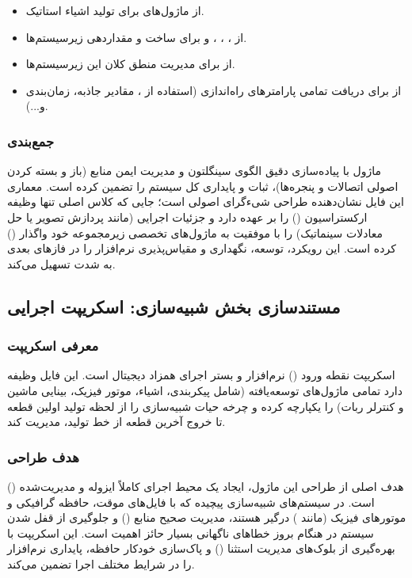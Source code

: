 \documentclass{article}
\begin{document}
\begin{itemize}
	\item از ماژول‌های  برای تولید اشیاء استاتیک.
	\item از ، ، ،  و  برای ساخت و مقداردهی زیرسیستم‌ها.
	\item از  برای مدیریت منطق کلان این زیرسیستم‌ها.
	\item از  برای دریافت تمامی پارامترهای راه‌اندازی (استفاده از ، مقادیر جاذبه، زمان‌بندی و...).
\end{itemize}

\subsubsection{جمع‌بندی}
ماژول  با پیاده‌سازی دقیق الگوی سینگلتون و مدیریت ایمن منابع (باز و بسته کردن اصولی اتصالات و پنجره‌ها)، ثبات و پایداری کل سیستم را تضمین کرده است. معماری این فایل نشان‌دهنده طراحی شیءگرای اصولی است؛ جایی که کلاس اصلی تنها وظیفه ارکستراسیون () را بر عهده دارد و جزئیات اجرایی (مانند پردازش تصویر یا حل معادلات سینماتیک) را با موفقیت به ماژول‌های تخصصی زیرمجموعه خود واگذار () کرده است. این رویکرد، توسعه، نگهداری و مقیاس‌پذیری نرم‌افزار را در فازهای بعدی به شدت تسهیل می‌کند.


\subsection{مستندسازی بخش شبیه‌سازی: اسکریپت اجرایی }

\subsubsection{معرفی اسکریپت}
اسکریپت  نقطه ورود () نرم‌افزار و بستر اجرای همزاد دیجیتال است. این فایل وظیفه دارد تمامی ماژول‌های توسعه‌یافته (شامل پیکربندی، اشیاء، موتور فیزیک، بینایی ماشین و کنترلر ربات) را یکپارچه کرده و چرخه حیات شبیه‌سازی را از لحظه تولید اولین قطعه تا خروج آخرین قطعه از خط تولید، مدیریت کند.

\subsubsection{هدف طراحی}
هدف اصلی از طراحی این ماژول، ایجاد یک محیط اجرای کاملاً ایزوله و مدیریت‌شده () است. در سیستم‌های شبیه‌سازی پیچیده که با فایل‌های موقت، حافظه گرافیکی و موتورهای فیزیک (مانند ) درگیر هستند، مدیریت صحیح منابع () و جلوگیری از قفل شدن سیستم در هنگام بروز خطاهای ناگهانی بسیار حائز اهمیت است. این اسکریپت با بهره‌گیری از بلوک‌های مدیریت استثنا () و پاک‌سازی خودکار حافظه، پایداری نرم‌افزار را در شرایط مختلف اجرا تضمین می‌کند.
\end{document}
